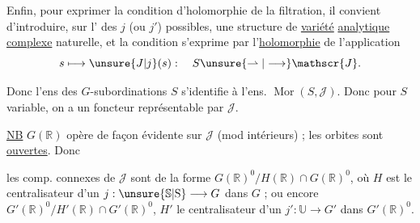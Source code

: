 Enfin, pour exprimer la condition d'holomorphie de la filtration, il convient d'introduire,  sur l'  des $j$ (ou $j'$) possibles, une structure de \uline{variété} \uline{analytique} \uline{complexe} naturelle, et la condition s'exprime par l'\uline{holomorphie} de l'application
\[
s\longmapsto\unsure{J|j}(s):\quad S\unsure{\rightharpoonup|\longrightarrow}\mathscr{J}.
\]

 Donc l'ens des $G$-subordinations   $S$ s'identifie à l'ens. $\operatorname{Mor}(S,\mathscr{J})$. Donc pour $S$ variable, on a un foncteur représentable par $\mathscr{J}$.

\uline{NB} $G(\mathbb{R})$ opère de façon évidente sur $\mathscr{J}$ (mod  intérieurs) ; les orbites sont \uline{ouvertes}. Donc


les comp. connexes de $\mathscr{J}$ sont de la forme $G(\mathbb{R})^{0}/H(\mathbb{R})\cap G(\mathbb{R})^{0}$, où $H$ est le centralisateur d'un $j:\unsure{\mathbb{S}|\mathrm{S}}\longrightarrow G$ dans $G$ ; ou encore $G'(\mathbb{R})^{0}/H'(\mathbb{R})\cap G'(\mathbb{R})^{0}$, $H'$ le centralisateur d'un $j':\mathbb{U}\longrightarrow G'$ dans $G'(\mathbb{R})^{0}$.

